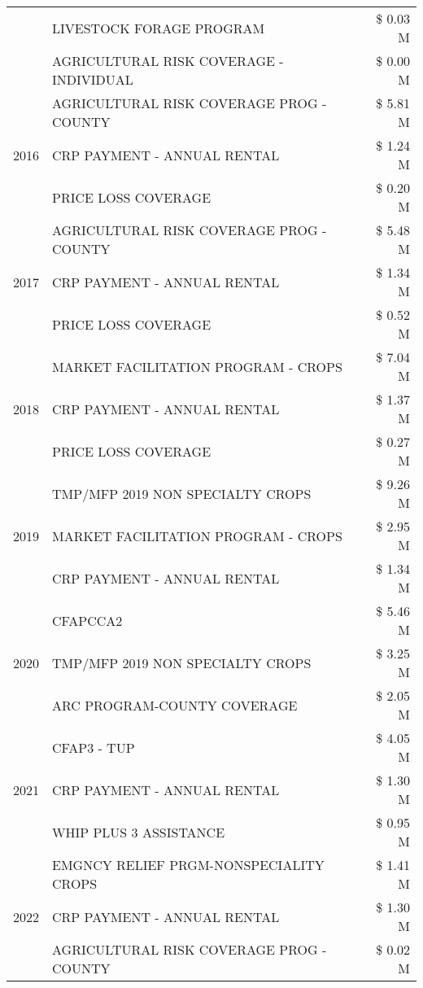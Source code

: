 \begin{tabular}{llr}
 & LIVESTOCK FORAGE PROGRAM & \$ 0.03 M \\
 & AGRICULTURAL RISK COVERAGE - INDIVIDUAL & \$ 0.00 M \\
\cline{1-3}
\multirow[t]{3}{*}{2016} & AGRICULTURAL RISK COVERAGE PROG - COUNTY & \$ 5.81 M \\
 & CRP PAYMENT - ANNUAL RENTAL & \$ 1.24 M \\
 & PRICE LOSS COVERAGE & \$ 0.20 M \\
\cline{1-3}
\multirow[t]{3}{*}{2017} & AGRICULTURAL RISK COVERAGE PROG - COUNTY & \$ 5.48 M \\
 & CRP PAYMENT - ANNUAL RENTAL & \$ 1.34 M \\
 & PRICE LOSS COVERAGE & \$ 0.52 M \\
\cline{1-3}
\multirow[t]{3}{*}{2018} & MARKET FACILITATION PROGRAM - CROPS & \$ 7.04 M \\
 & CRP PAYMENT - ANNUAL RENTAL & \$ 1.37 M \\
 & PRICE LOSS COVERAGE & \$ 0.27 M \\
\cline{1-3}
\multirow[t]{3}{*}{2019} & TMP/MFP 2019 NON SPECIALTY CROPS & \$ 9.26 M \\
 & MARKET FACILITATION PROGRAM - CROPS & \$ 2.95 M \\
 & CRP PAYMENT - ANNUAL RENTAL & \$ 1.34 M \\
\cline{1-3}
\multirow[t]{3}{*}{2020} & CFAPCCA2 & \$ 5.46 M \\
 & TMP/MFP 2019 NON SPECIALTY CROPS & \$ 3.25 M \\
 & ARC PROGRAM-COUNTY COVERAGE & \$ 2.05 M \\
\cline{1-3}
\multirow[t]{3}{*}{2021} & CFAP3 - TUP & \$ 4.05 M \\
 & CRP PAYMENT - ANNUAL RENTAL & \$ 1.30 M \\
 & WHIP PLUS 3 ASSISTANCE & \$ 0.95 M \\
\cline{1-3}
\multirow[t]{3}{*}{2022} & EMGNCY RELIEF PRGM-NONSPECIALITY CROPS & \$ 1.41 M \\
 & CRP PAYMENT - ANNUAL RENTAL & \$ 1.30 M \\
 & AGRICULTURAL RISK COVERAGE PROG - COUNTY & \$ 0.02 M \\
\cline{1-3}
\bottomrule
\end{tabular}
